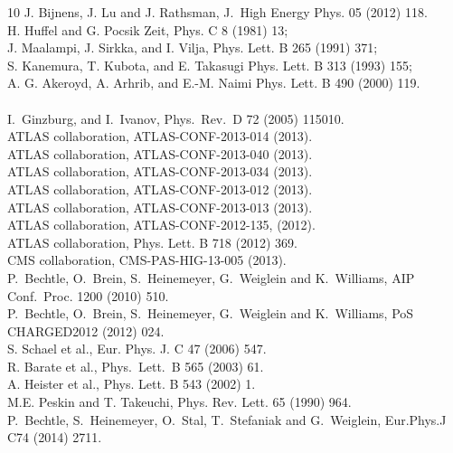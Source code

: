 \begin{thebibliography}{10}
J. Bijnens, J. Lu and J. Rathsman, J.~High Energy Phys. 05 (2012) 118.
\\
H. Huffel and G. Pocsik Zeit, Phys. C 8 (1981) 13; \\
J. Maalampi, J. Sirkka, and I. Vilja, Phys. Lett. B 265 (1991) 371; \\
S. Kanemura, T. Kubota, and E. Takasugi Phys. Lett. B 313 (1993) 155; \\
A. G. Akeroyd, A. Arhrib, and E.-M. Naimi Phys. Lett. B 490 (2000) 119.\\
\\
 I.~Ginzburg, and I.~Ivanov, Phys.~Rev.~D 72 (2005) 115010.
\\
ATLAS collaboration, ATLAS-CONF-2013-014 (2013). 
\\
ATLAS collaboration, ATLAS-CONF-2013-040 (2013). 
\\
ATLAS collaboration, ATLAS-CONF-2013-034 (2013). 
\\
ATLAS collaboration, ATLAS-CONF-2013-012 (2013).
\\
ATLAS collaboration, ATLAS-CONF-2013-013 (2013).
\\
ATLAS collaboration, ATLAS-CONF-2012-135, (2012).
\\
ATLAS collaboration, Phys. Lett. B 718 (2012) 369.
\\
CMS collaboration, CMS-PAS-HIG-13-005 (2013).
\\
P.~Bechtle, O.~Brein, S.~Heinemeyer, G.~Weiglein and K.~Williams, AIP Conf.~Proc. 1200 (2010) 510.
\\
P.~Bechtle, O.~Brein, S.~Heinemeyer, G.~Weiglein and K.~Williams, PoS CHARGED2012 (2012) 024.
\\
S. Schael et al., Eur. Phys. J. C 47 (2006) 547.
\\
R. Barate et al., Phys.~Lett.~B 565 (2003) 61.
\\
A. Heister et al., Phys. Lett. B 543 (2002) 1.
\\
M.E. Peskin and T. Takeuchi, Phys. Rev. Lett. 65 (1990) 964.
\\
P.~Bechtle, S.~Heinemeyer, O.~Stal, T.~Stefaniak and G.~Weiglein, Eur.Phys.J C74 (2014) 2711.
\\

\end{thebibliography}

